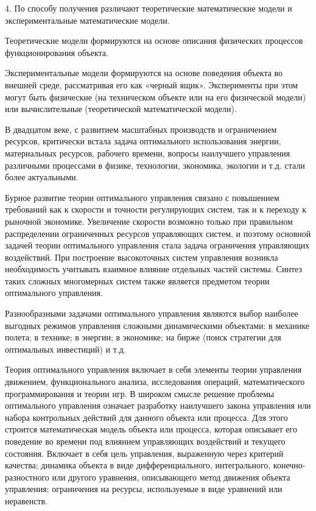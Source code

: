 4. По способу получения различают теоретические математические модели и экспериментальные математические модели.


Теоретические модели формируются на основе описания физических процессов функционирования объекта.


Экспериментальные модели формируются на основе поведения объекта во внешней среде, рассматривая его как «черный ящик». Эксперименты при этом могут быть физические (на техническом объекте или на его физической модели) или вычислительные (теоретической математической модели). 


В двадцатом веке, с развитием масштабных производств и ограничением ресурсов, критически встала задача оптимального использования энергии, материальных ресурсов, рабочего времени, вопросы наилучшего управления различными процессами в физике, технологии, экономика, экологии и т.д. стали более актуальными.


Бурное развитие теории оптимального управления связано с повышением требований как к скорости и точности регулирующих систем, так и к переходу к рыночной экономике. Увеличение скорости возможно только при правильном распределении ограниченных ресурсов управляющих систем, и поэтому основной задачей теории оптимального управления стала задача ограничения управляющих воздействий. При построение высокоточных систем управления возникла необходимость учитывать взаимное влияние отдельных частей системы. Синтез таких сложных многомерных систем также является предметом теории оптимального управления.


Разнообразными задачами оптимального управления являются выбор наиболее выгодных режимов управления сложными динамическими объектами: в механике полета; в технике; в энергии; в экономике; на бирже (поиск стратегии для оптимальных инвестиций) и т.д.


Теория оптимального управления включает в себя элементы теории управления движением, функционального анализа, исследования операций, математического программирования и теории игр. В широком смысле решение проблемы оптимального управления означает разработку наилучшего закона управления или набора контрольных действий для данного объекта или процесса. Для этого строится математическая модель объекта или процесса, которая описывает его поведение во времени под влиянием управляющих воздействий и текущего состояния. Включает в себя цель управления, выраженную через критерий качества; динамика объекта в виде дифференциального, интегрального, конечно-разностного или другого уравнения, описывающего метод движения объекта управления; ограничения на ресурсы, используемые в виде уравнений или неравенств.


